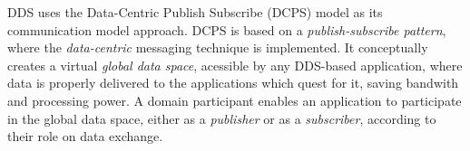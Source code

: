 

DDS uses the Data-Centric Publish Subscribe (DCPS) model as its communication model approach. DCPS is based on a \textit{publish-subscribe pattern}, where the \textit{data-centric} messaging technique is implemented. It conceptually creates a virtual \textit{global data space}, acessible by any DDS-based application, where data is properly delivered to the applications which quest for it, saving bandwith and processing power. \cite{3, pardo2005introduction} A domain participant enables an application to participate in the global data space, either as a \textit{publisher} or as a \textit{subscriber}, according to their role on data exchange. \cite{maruyama2016exploring, alaerjan2017modeling, dcps-rtps} 



